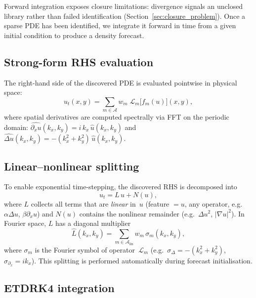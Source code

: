 Forward integration exposes closure limitations: divergence signals an
unclosed library rather than failed identification
(Section~\ref{sec:closure_problem}).
Once a sparse PDE has been identified, we integrate it forward in time
from a given initial condition to produce a density forecast.

\subsection{Strong-form RHS evaluation}
\label{subsec:rhs}

The right-hand side of the discovered PDE is evaluated pointwise in
physical space:
\begin{equation}
  u_t(x,y)
  = \sum_{m\in\mathcal{A}} w_m\;\mathcal{L}_m\!\bigl[f_m(u)\bigr](x,y),
  \label{eq:rhs_eval}
\end{equation}
where spatial derivatives are computed spectrally via FFT on the periodic
domain:
$\widehat{\partial_x u}(k_x,k_y) = i\,k_x\,\hat{u}(k_x,k_y)$
and
$\widehat{\Delta u}(k_x,k_y) = -(k_x^2+k_y^2)\,\hat{u}(k_x,k_y)$.

\subsection{Linear--nonlinear splitting}
\label{subsec:splitting}

To enable exponential time-stepping, the discovered RHS is decomposed into
\begin{equation}
  u_t = L\,u + N(u),
  \label{eq:lin_nonlin_split}
\end{equation}
where $L$ collects all terms that are \emph{linear} in~$u$ (feature $=u$,
any operator, e.g.\ $\alpha\Delta u$, $\beta\partial_x u$) and $N(u)$
contains the nonlinear remainder (e.g.\ $\Delta u^2$, $|\nabla u|^2$).
In Fourier space, $L$ has a diagonal multiplier
\begin{equation}
  \hat{L}(k_x,k_y)
  = \sum_{m\in\mathcal{A}_{\mathrm{lin}}} w_m\,\sigma_m(k_x,k_y),
  \label{eq:L_hat}
\end{equation}
where $\sigma_m$ is the Fourier symbol of operator~$\mathcal{L}_m$
(e.g.\ $\sigma_{\Delta}=-(k_x^2+k_y^2)$, $\sigma_{\partial_x}=ik_x$).
This splitting is performed automatically during forecast initialisation.

\subsection{ETDRK4 integration}
\label{subsec:etdrk4}

